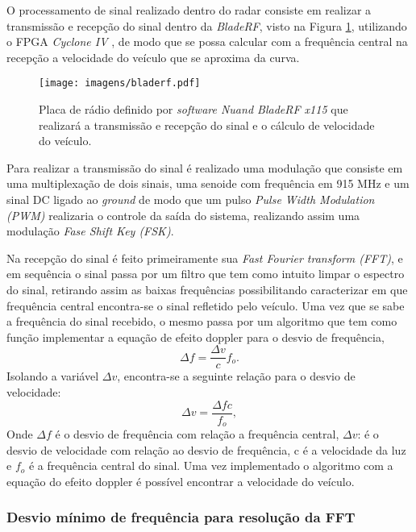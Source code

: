 O processamento de sinal realizado dentro do radar consiste em realizar a transmissão e recepção do sinal dentro da \emph{BladeRF}, visto na Figura \ref{bladerf}, utilizando o FPGA \emph{Cyclone IV} , de modo que se possa calcular com a frequência central na recepção a velocidade do veículo que se aproxima da curva. 

\begin{figure}[H]
    \centering
   \texttt{[image: imagens/bladerf.pdf]}
   \caption{Placa de rádio definido por \emph{software Nuand BladeRF x115} que realizará a transmissão e recepção do sinal e o cálculo de velocidade do veículo.}
   \label{bladerf}
    \end{figure}

Para realizar a transmissão do sinal é realizado uma modulação que consiste em uma multiplexação de dois sinais, uma senoide com frequência em 915 MHz e um sinal DC ligado ao \emph{ground} de modo que um pulso \emph{Pulse Width Modulation (PWM)} realizaria o controle da saída do sistema, realizando assim uma modulação \emph{Fase Shift Key (FSK)}.

Na recepção do sinal é feito primeiramente sua \emph{Fast Fourier transform (FFT)}, e em sequência o sinal passa por um filtro que tem como intuito limpar o espectro do sinal, retirando assim as baixas frequências possibilitando caracterizar em que frequência central encontra-se o sinal refletido pelo veículo. Uma vez que se sabe a frequência do sinal recebido, o mesmo passa por um algoritmo que tem como função implementar a equação de efeito doppler para o desvio de frequência,
\begin{equation}\label{freq_desv}
  \Delta f = \frac{\Delta v}{c}f_o.
\end{equation}
Isolando a variável $\Delta v$, encontra-se a seguinte relação para o desvio de velocidade:
\begin{equation}\label{vel}
  \Delta v = \frac{\Delta f c}{f_o},
\end{equation}
Onde $\Delta f$ é o desvio de frequência com relação a frequência central, $\Delta v$: é o desvio de velocidade com relação ao desvio de frequência, c é a velocidade da luz e $f_o$ é a frequência central do sinal. Uma vez implementado o algoritmo com a equação do efeito doppler é possível encontrar a velocidade do veículo.

\subsubsection{Desvio mínimo de frequência para resolução da FFT}

